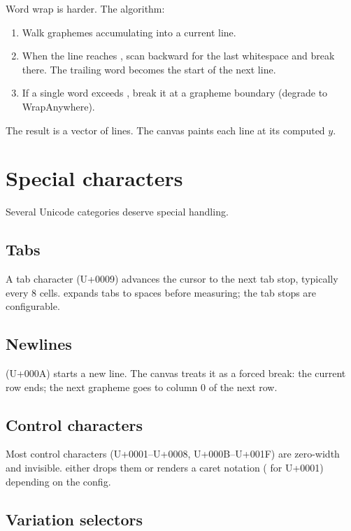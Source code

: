 Word wrap is harder. The algorithm:

\begin{enumerate}[leftmargin=*]
  \item Walk graphemes accumulating into a current line.
  \item When the line reaches , scan backward
    for the last whitespace and break there. The trailing word
    becomes the start of the next line.
  \item If a single word exceeds , break it
    at a grapheme boundary (degrade to WrapAnywhere).
\end{enumerate}

The result is a vector of lines. The canvas paints each line at
its computed $y$.

\section{Special characters}

Several Unicode categories deserve special handling.

\subsection*{Tabs}

A tab character (U+0009) advances the cursor to the next tab
stop, typically every 8 cells. \maya{} expands tabs to spaces
before measuring; the tab stops are configurable.

\subsection*{Newlines}

\code{\\n} (U+000A) starts a new line. The canvas treats it as a
forced break: the current row ends; the next grapheme goes to
column 0 of the next row.

\subsection*{Control characters}

Most control characters (U+0001--U+0008, U+000B--U+001F) are
zero-width and invisible. \maya{} either drops them or renders a
caret notation ( for U+0001) depending
on the  config.

\subsection*{Variation selectors}

